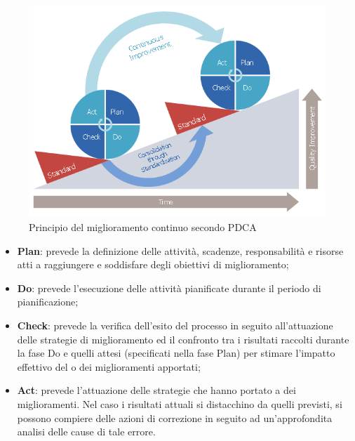 \documentclass[11pt,a4paper]{article}
\begin{document}
{\begin{figure}[htbp]
	\includegraphics[scale=0.5]{images/pdca.png}
	\caption{Principio del miglioramento continuo secondo PDCA}
	
\end{figure}

\begin{itemize}
	\item \textbf{Plan}: prevede la definizione delle attività, scadenze, responsabilità e risorse atti a raggiungere e soddisfare degli obiettivi di miglioramento;
	\item \textbf{Do}: prevede l'esecuzione delle attività pianificate durante il periodo di pianificazione;
	\item \textbf{Check}: prevede la verifica dell'esito del processo in seguito all'attuazione delle strategie di miglioramento ed il confronto tra i risultati raccolti durante la fase Do e quelli attesi (specificati nella fase Plan) per stimare l'impatto effettivo del o dei miglioramenti apportati;
	\item \textbf{Act}: prevede l'attuazione delle strategie che hanno portato a dei miglioramenti. Nel caso i risultati attuali si distacchino da quelli previsti, si possono compiere delle azioni di correzione in seguito ad un'approfondita analisi delle cause di tale errore. 
\end{itemize}

}
\end{document}
